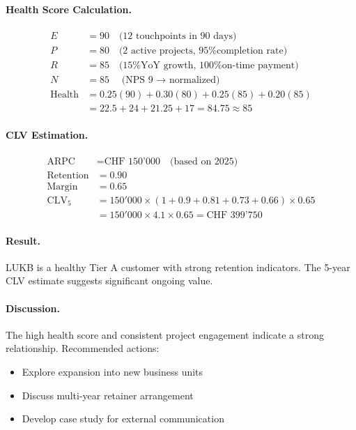 \paragraph{Health Score Calculation.}
\begin{align}
E &= 90 \quad \text{(12 touchpoints in 90 days)} \\
P &= 80 \quad \text{(2 active projects, 95\% completion rate)} \\
R &= 85 \quad \text{(15\% YoY growth, 100\% on-time payment)} \\
N &= 85 \quad \text{(NPS 9 $\rightarrow$ normalized)} \\
\text{Health} &= 0.25(90) + 0.30(80) + 0.25(85) + 0.20(85) \\
&= 22.5 + 24 + 21.25 + 17 = 84.75 \approx 85
\end{align}

\paragraph{CLV Estimation.}
\begin{align}
\text{ARPC} &= \text{CHF 150'000} \quad \text{(based on 2025)} \\
\text{Retention} &= 0.90 \\
\text{Margin} &= 0.65 \\
\text{CLV}_5 &= 150'000 \times (1 + 0.9 + 0.81 + 0.73 + 0.66) \times 0.65 \\
&= 150'000 \times 4.1 \times 0.65 = \text{CHF 399'750}
\end{align}

\paragraph{Result.} LUKB is a healthy Tier A customer with strong retention
indicators. The 5-year CLV estimate suggests significant ongoing value.

\paragraph{Discussion.} The high health score and consistent project engagement
indicate a strong relationship. Recommended actions:
\begin{itemize}
\item Explore expansion into new business units
\item Discuss multi-year retainer arrangement
\item Develop case study for external communication
\end{itemize}


